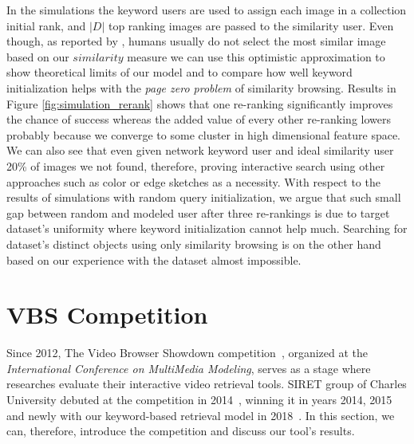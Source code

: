 In the simulations the keyword users are used to assign each image in a collection initial rank, and $|D|$ top ranking images are passed to the similarity user. Even though, as reported by \cite{kovalvcik2017comparison}, humans usually do not select the most similar image based on our $similarity$ measure we can use this optimistic approximation to show theoretical limits of our model and to compare how well keyword initialization helps with the \textit{page zero problem} of similarity browsing.
Results in Figure \ref{fig:simulation_rerank} shows that one re-ranking significantly improves the chance of success whereas the added value of every other re-ranking lowers probably because we converge to some cluster in high dimensional feature space. We can also see that even given network keyword user and ideal similarity user 20\% of images we not found, therefore, proving interactive search using other approaches such as color or edge sketches as a necessity. With respect to the results of simulations with random query initialization, we argue that such small gap between random and modeled user after three re-rankings is due to target dataset's uniformity where keyword initialization cannot help much. Searching for dataset's distinct objects using only similarity browsing is on the other hand based on our experience with the dataset almost impossible.



\section{VBS Competition}

Since 2012, The Video Browser Showdown competition~\cite{cobarzan2017interactive,Lokoc-influential-trends}, organized at the \textit{International Conference on MultiMedia Modeling}, serves as a stage where researches evaluate their interactive video retrieval tools. SIRET group of Charles University debuted at the competition in 2014~\cite{Lokoc-VBS2014}, winning it in years 2014, 2015 and newly with our keyword-based retrieval model in 2018~\cite{lokovc2018revisiting}. In this section, we can, therefore, introduce the competition and discuss our tool's results.

